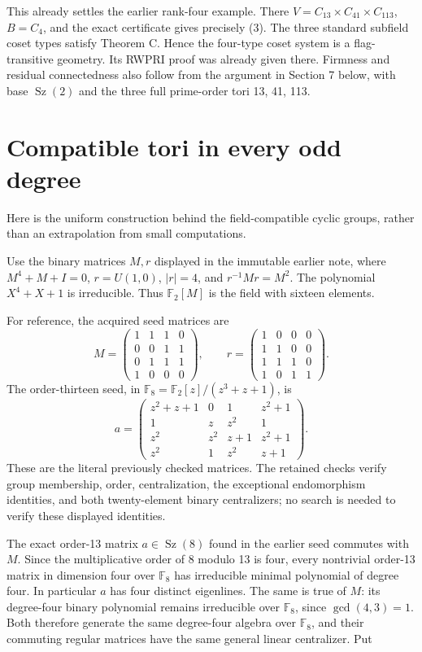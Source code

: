 \documentclass[11pt,a4paper]{article}
\begin{document}
This already settles the earlier rank-four example. There
\(V=C_{13}\times C_{41}\times C_{113}\), \(B=C_4\), and the exact
certificate gives precisely (3). The three standard subfield coset types
satisfy Theorem C. Hence the four-type coset system is a flag-transitive
geometry. Its RWPRI proof was already given there. Firmness and residual
connectedness also follow from the argument in Section 7 below, with
base \(\operatorname{Sz}(2)\) and the three full prime-order tori 13,
41, 113.

\section{Compatible tori in every odd
degree}\label{compatible-tori-in-every-odd-degree}

Here is the uniform construction behind the field-compatible cyclic
groups, rather than an extrapolation from small computations.

Use the binary matrices \(M,r\) displayed in the immutable earlier note,
where \(M^4+M+I=0\), \(r=U(1,0)\), \(|r|=4\), and \(r^{-1}Mr=M^2\). The
polynomial \(X^4+X+1\) is irreducible. Thus \(\mathbb F_2[M]\) is the
field with sixteen elements.

For reference, the acquired seed matrices are
\[
 M=\begin{pmatrix}1&1&1&0\\0&0&1&1\\0&1&1&1\\1&0&0&0\end{pmatrix},
 \qquad r=\begin{pmatrix}1&0&0&0\\1&1&0&0\\1&1&1&0\\1&0&1&1\end{pmatrix}.
\]
The order-thirteen seed, in
$\mathbb F_8=\mathbb F_2[z]/(z^3+z+1)$, is
\[
 a=\begin{pmatrix}
 z^2+z+1&0&1&z^2+1\\
 1&z&z^2&1\\
 z^2&z^2&z+1&z^2+1\\
 z^2&1&z^2&z+1
 \end{pmatrix}.
\]
These are the literal previously checked matrices. The retained checks
verify group membership, order, centralization, the exceptional
endomorphism identities, and both twenty-element binary centralizers;
no search is needed to verify these displayed identities.

The exact order-13 matrix \(a\in\operatorname{Sz}(8)\) found in the
earlier seed commutes with \(M\). Since the multiplicative order of 8
modulo 13 is four, every nontrivial order-13 matrix in dimension four
over \(\mathbb F_8\) has irreducible minimal polynomial of degree four.
In particular \(a\) has four distinct eigenlines. The same is true of
\(M\): its degree-four binary polynomial remains irreducible over
\(\mathbb F_8\), since \(\gcd(4,3)=1\). Both therefore generate the same
degree-four algebra over \(\mathbb F_8\), and their commuting regular
matrices have the same general linear centralizer. Put
\end{document}
